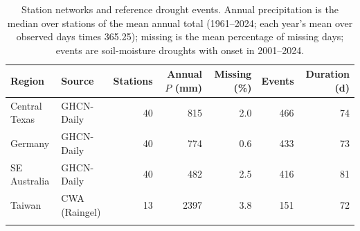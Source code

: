 \begin{table}[tbp]
\caption{Station networks and reference drought events. Annual precipitation is the median over
stations of the mean annual total (1961--2024; each year's mean over observed days times 365.25); missing is the mean percentage of missing days;
events are soil-moisture droughts with onset in 2001--2024.}\label{tab:data}
\footnotesize\setlength{\tabcolsep}{4pt}
\begin{tabular*}{\textwidth}{@{\extracolsep\fill}llrrrrr}
\toprule
Region & Source & Stations & Annual $P$ (mm) & Missing (\%) & Events & Duration (d)\\
\midrule
Central Texas & GHCN-Daily & 40 & 815 & 2.0 & 466 & 74 \\
Germany & GHCN-Daily & 40 & 774 & 0.6 & 433 & 73 \\
SE Australia & GHCN-Daily & 40 & 482 & 2.5 & 416 & 81 \\
Taiwan & CWA (Raingel) & 13 & 2397 & 3.8 & 151 & 72 \\
\botrule
\end{tabular*}
\end{table}
